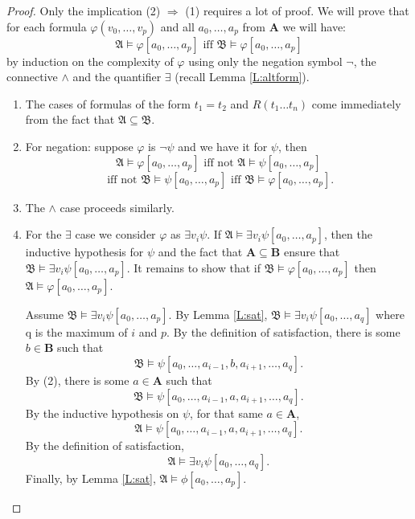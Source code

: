 \documentclass[titlepage, oneside]{amsbook}
\theoremstyle{plain}
\theoremstyle{definition}
\theoremstyle{remark}
\newcommand{\seq}{\ensuremath{\subseteq}}
\newcommand{\ma}{\ensuremath{\mathfrak{A}}}
\newcommand{\mb}{\ensuremath{\mathfrak{B}}}
\newcommand{\ba}{\ensuremath{\mathbf{A}}}
\newcommand{\bb}{\ensuremath{\mathbf{B}}}
\newcommand{\anot}[2][0]{\ensuremath{ a_{#1} , \dots , a_{#2}}}
\begin{document}
\begin{proof} Only the implication (2) $\Rightarrow$ (1) requires a lot 
of proof. We will prove that for each formula $\varphi (v_{0}, \dots , 
v_{p})$ and all $a_{0}, \dots , a_{p}$ from $\mathbf{A}$ we will have:
\[ \mathfrak{A} \models \varphi [a_{0} , \dots , a_{p}] \mbox{ iff } 
\mathfrak{B} \models \varphi [a_{0}, \dots , a_{p}] \] 
by induction on 
the complexity of $\varphi$ using only the negation symbol $\neg$, the 
connective $\wedge$ and the quantifier $\exists$ (recall Lemma
\ref{L:altform}).

\begin{enumerate} 
\item The cases of formulas of the form $t_1 = t_2$ and $R ( t_1 \dots
t_n)$  come immediately from the fact that
$\ma \seq \mb$.
\item For negation: suppose $\varphi$ is $\neg \psi$ and we have it for 
$\psi$, then 
\[ \mathfrak{A} \models \varphi [a_{0}, \dots , a_{p}] \mbox{  iff not } 
\mathfrak{A} \models \psi [a_{0}, \dots, a_{p}] \]           
\[ \mbox{ iff not }  \mathfrak{B} \models \psi [a_{0} , \dots , a_{p}]
\mbox{ iff } \mathfrak{B} \models \varphi [a_{0} ,\dots ,a_{p}]. \]

\item The $\wedge$ case proceeds similarly.

\item For the $\exists$ case we consider $\varphi$ as $\exists v_i \psi$.
If $\ma \models \exists v_i \psi [ \anot{p} ]$, then the inductive
hypothesis for $\psi$ and the fact that $\ba \seq \bb$ ensure that \\
$\mb \models \exists v_i \psi [ \anot p ]$.  It remains to show that if 
$\mb \models \varphi [\anot p ] $ then $\ma \models \varphi [\anot p
]$.

Assume $\mb \models \exists v_i \psi [\anot p ] $.  By Lemma
\ref{L:sat}, $\mb \models \exists v_i \psi [\anot q ] $ where q is the
maximum of $i$ and $p$.  By the definition of satisfaction, there is
some $b \in \bb$ such that \[\mb \models \psi [ \anot{i-1} , b ,
\anot[i+1]{q} ].\]  By (2), there is some $a \in \ba$ such that \[\mb
\models \psi [ \anot{i-1}, a , \anot[i+1]{q} ].\]  By the inductive
hypothesis on $\psi$, for that same $a \in \ba$, \[ \ma \models \psi [
\anot{i-1}, a , \anot[i+1]{q} ]. \]
By the definition of satisfaction, \[ \ma \models \exists v_i \psi [
\anot{q} ] .\]  Finally, by Lemma \ref{L:sat}, $\ma \models \phi [
\anot{p}] $.

\end{enumerate}
\end{proof}
\end{document}
